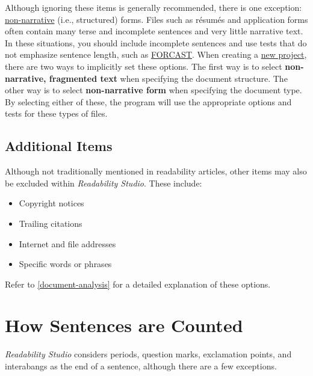 \documentclass[
]{book}
\providecommand{\tightlist}{%
  \setlength{\itemsep}{0pt}\setlength{\parskip}{0pt}}
\theoremstyle{definition}
\theoremstyle{definition}
\theoremstyle{definition}
\theoremstyle{definition}
\theoremstyle{remark}
\begin{document}
Although ignoring these items is generally recommended, there is one exception: \protect\hyperlink{framented-text}{non-narrative} (i.e., structured) forms. Files such as résumés and application forms often contain many terse and incomplete sentences and very little narrative text. In these situations, you should include incomplete sentences and use tests that do not emphasize sentence length, such as \protect\hyperlink{forcast-test}{FORCAST}. When creating a \protect\hyperlink{creating-standard-project}{new project}, there are two ways to implicitly set these options. The first way is to select \textbf{non-narrative, fragmented text} when specifying the document structure. The other way is to select \textbf{non-narrative form} when specifying the document type. By selecting either of these, the program will use the appropriate options and tests for these types of files.

\hypertarget{additional-items}{%
\subsection*{Additional Items}\label{additional-items}}

\begin{minipage}{\textwidth}

Although not traditionally mentioned in readability articles, other items may also be excluded within \emph{Readability Studio}. These include:

\begin{itemize}
\tightlist
\item
  Copyright notices
\item
  Trailing citations
\item
  Internet and file addresses
\item
  Specific words or phrases
\end{itemize}

\end{minipage}

Refer to \ref{document-analysis} for a detailed explanation of these options.

\hypertarget{how-sentences-are-counted}{%
\section{How Sentences are Counted}\label{how-sentences-are-counted}}

\emph{Readability Studio} considers periods, question marks, exclamation points, and interabangs as the end of a sentence, although there are a few exceptions.
\end{document}
